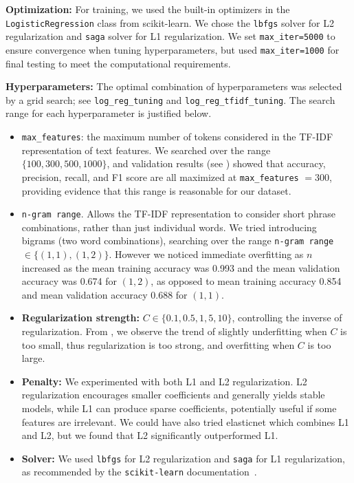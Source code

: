 \documentclass[12pt]{article}
\begin{document}
\textbf{Optimization:} For training, we used the built-in optimizers in the \texttt{LogisticRegression} class from scikit-learn. We chose the \texttt{lbfgs} solver for L2 regularization and \texttt{saga} solver for L1 regularization. We set \texttt{max\_iter=5000} to ensure convergence when tuning hyperparameters, but used \texttt{max\_iter=1000} for final testing to meet the computational requirements.

\textbf{Hyperparameters:}
The optimal combination of hyperparameters was selected by a grid search; see \texttt{log\_reg\_tuning} and \texttt{log\_reg\_tfidf\_tuning}. The search range for each hyperparameter is justified below.
\begin{itemize}
    \item \texttt{max\_features}: the maximum number of tokens considered in the TF-IDF representation of text features. We searched over the range $\{100, 300, 500, 1000\}$, and validation results (see ) showed that accuracy, precision, recall, and F1 score are all maximized at \texttt{max\_features} $= 300$, providing evidence that this range is reasonable for our dataset.
    \item \texttt{n-gram range}. Allows the TF-IDF representation to consider short phrase combinations, rather than just individual words. We tried introducing bigrams (two word combinations), searching over the range \texttt{n-gram range} $ \in \{(1,1), (1,2)\}$. However we noticed immediate overfitting as $n$ increased as the mean training accuracy was 0.993 and the mean validation accuracy was 0.674 for $(1,2)$, as opposed to mean training accuracy 0.854 and mean validation accuracy 0.688 for $(1,1)$.
    \item \textbf{Regularization strength:} $C \in \{0.1, 0.5, 1, 5, 10\}$, controlling the inverse of regularization. From , we observe the trend of slightly underfitting when $C$ is too small, thus regularization is too strong, and overfitting when $C$ is too large.
    \item \textbf{Penalty:} We experimented with both L1 and L2 regularization. 
    L2 regularization encourages smaller coefficients and generally yields
    stable models, while L1 can produce sparse coefficients, potentially useful
    if some features are irrelevant. We could have also tried elasticnet which combines L1 and L2, but we found that L2 significantly outperformed L1.
    \item \textbf{Solver:} We used \texttt{lbfgs} for L2 regularization and
    \texttt{saga} for L1 regularization, as recommended by the
    \texttt{scikit-learn} documentation~\cite{sklearn_logreg}.
\end{itemize}
\end{document}
